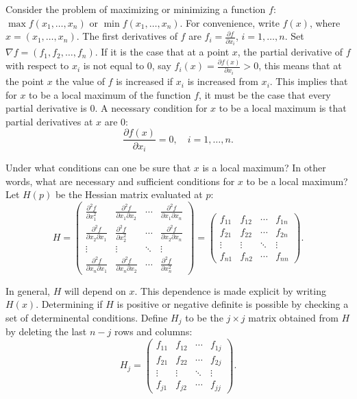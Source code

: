 \begin{original}
Consider the problem of maximizing or minimizing a function $f$: $\max f(x_1,\ldots,x_n)$ or $\min f(x_1,\ldots,x_n)$. For convenience, write $f(x)$, where $x = (x_1,\ldots,x_n)$. The first derivatives of $f$ are $f_i = \frac{\partial f}{\partial x_i}$, $i = 1,\ldots,n$. Set $\nabla f = (f_1, f_2, \ldots, f_n)$. If it is the case that at a point $x$, the partial derivative of $f$ with respect to $x_i$ is not equal to 0, say $f_i(x) = \frac{\partial f(x)}{\partial x_i} > 0$, this means that at the point $x$ the value of $f$ is increased if $x_i$ is increased from $x_i$. This implies that for $x$ to be a local maximum of the function $f$, it must be the case that every partial derivative is 0. A necessary condition for $x$ to be a local maximum is that partial derivatives at $x$ are 0:
\[
\frac{\partial f(x)}{\partial x_i} = 0, \quad i = 1,\ldots,n.
\]

Under what conditions can one be sure that $x$ is a local maximum? In other words, what are necessary and sufficient conditions for $x$ to be a local maximum? Let $H(p)$ be the Hessian matrix evaluated at $p$:
\[
H = \begin{pmatrix}
\frac{\partial^2 f}{\partial x_1^2} & \frac{\partial^2 f}{\partial x_1 \partial x_2} & \cdots & \frac{\partial^2 f}{\partial x_1 \partial x_n} \\
\frac{\partial^2 f}{\partial x_2 \partial x_1} & \frac{\partial^2 f}{\partial x_2^2} & \cdots & \frac{\partial^2 f}{\partial x_2 \partial x_n} \\
\vdots & \vdots & \ddots & \vdots \\
\frac{\partial^2 f}{\partial x_n \partial x_1} & \frac{\partial^2 f}{\partial x_n \partial x_2} & \cdots & \frac{\partial^2 f}{\partial x_n^2}
\end{pmatrix}
= \begin{pmatrix}
f_{11} & f_{12} & \cdots & f_{1n} \\
f_{21} & f_{22} & \cdots & f_{2n} \\
\vdots & \vdots & \ddots & \vdots \\
f_{n1} & f_{n2} & \cdots & f_{nn}
\end{pmatrix}.
\]

In general, $H$ will depend on $x$. This dependence is made explicit by writing $H(x)$. Determining if $H$ is positive or negative definite is possible by checking a set of determinental conditions. Define $H_j$ to be the $j \times j$ matrix obtained from $H$ by deleting the last $n-j$ rows and columns:
\[
H_j = \begin{pmatrix}
f_{11} & f_{12} & \cdots & f_{1j} \\
f_{21} & f_{22} & \cdots & f_{2j} \\
\vdots & \vdots & \ddots & \vdots \\
f_{j1} & f_{j2} & \cdots & f_{jj}
\end{pmatrix}.
\]


\end{original}
